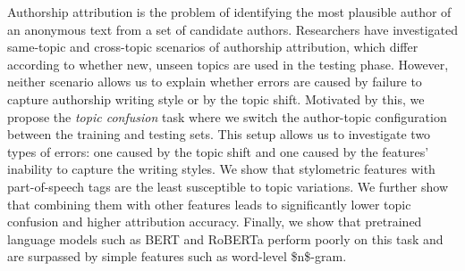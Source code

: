 Authorship attribution is the problem of identifying the most plausible author of an anonymous text from a set of candidate authors. Researchers have investigated same-topic and cross-topic scenarios of authorship attribution, which differ according to whether new, unseen topics are used in the testing phase. However, neither scenario allows us to explain whether errors are caused by failure to capture authorship writing style or by the topic shift. Motivated by this, we propose the \emph{topic confusion} task where we switch the author-topic configuration between the training and testing sets. This setup allows us to investigate two types of errors: one caused by the topic shift and one caused by the features' inability to capture the writing styles. We show that stylometric features with part-of-speech tags are the least susceptible to topic variations. We further show that combining them with other features leads to significantly lower topic confusion and higher attribution accuracy. Finally, we show that pretrained language models such as BERT and RoBERTa perform poorly on this task and are surpassed by simple features such as word-level \$n\$-gram.
